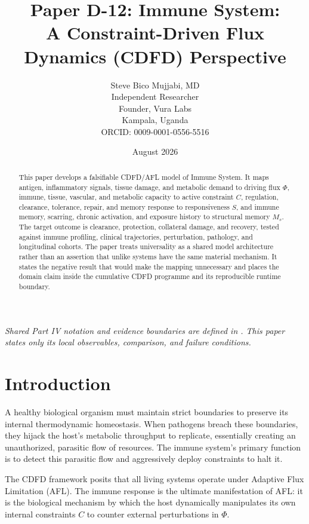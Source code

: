 \documentclass[11pt,a4paper]{article}
\title{\textbf{Paper D-12: Immune System:\\ A Constraint-Driven Flux Dynamics (CDFD) Perspective}}
\author{Steve Bico Mujjabi, MD\\
\small Independent Researcher\\
\small Founder, Vura Labs\\
\small Kampala, Uganda\\
\small ORCID: 0009-0001-0556-5516}
\date{August 2026}
\begin{document}
\maketitle

\noindent\textit{Shared Part IV notation and evidence boundaries are defined in . This paper states only its local observables, comparison, and failure conditions.}


\begin{abstract}
This paper develops a falsifiable CDFD/AFL model of Immune System. It maps antigen, inflammatory signals, tissue damage, and metabolic demand to driving flux $\Phi$, immune, tissue, vascular, and metabolic capacity to active constraint $C$, regulation, clearance, tolerance, repair, and memory response to responsiveness $S$, and immune memory, scarring, chronic activation, and exposure history to structural memory $M_s$. The target outcome is clearance, protection, collateral damage, and recovery, tested against immune profiling, clinical trajectories, perturbation, pathology, and longitudinal cohorts. The paper treats universality as a shared model architecture rather than an assertion that unlike systems have the same material mechanism. It states the negative result that would make the mapping unnecessary and places the domain claim inside the cumulative CDFD programme and its reproducible runtime boundary.
\end{abstract}

\section{Introduction}

A healthy biological organism must maintain strict boundaries to preserve its internal thermodynamic homeostasis. When pathogens breach these boundaries, they hijack the host's metabolic throughput to replicate, essentially creating an unauthorized, parasitic flow of resources. The immune system's primary function is to detect this parasitic flow and aggressively deploy constraints to halt it.

The CDFD framework posits that all living systems operate under Adaptive Flux Limitation (AFL). The immune response is the ultimate manifestation of AFL: it is the biological mechanism by which the host dynamically manipulates its own internal constraints $C$ to counter external perturbations in $\Phi$.
\end{document}

